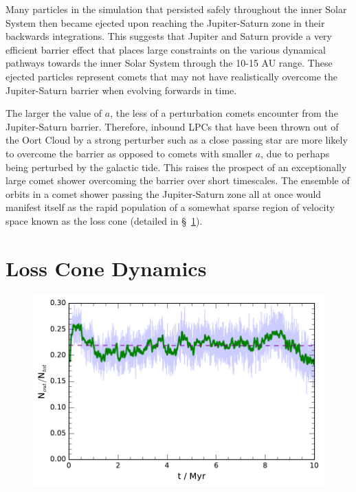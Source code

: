Many particles in the simulation that persisted safely throughout the inner Solar System then became ejected upon reaching the Jupiter-Saturn zone in their backwards integrations. This suggests that Jupiter and Saturn provide a very efficient barrier effect that places large constraints on the various dynamical pathways towards the inner Solar System through the 10-15 AU range. These ejected particles represent comets that may not have realistically overcome the Jupiter-Saturn barrier when evolving forwards in time.

The larger the value of $a$, the less of a perturbation comets encounter from the Jupiter-Saturn barrier. Therefore, inbound LPCs that have been thrown out of the Oort Cloud by a strong perturber such as a close passing star are more likely to overcome the barrier as opposed to comets with smaller $a$, due to perhaps being perturbed by the galactic tide. This raises the prospect of an exceptionally large comet shower overcoming the barrier over short timescales. The ensemble of orbits in a comet shower passing the Jupiter-Saturn zone all at once would manifest itself as the rapid population of a somewhat sparse region of velocity space known as the loss cone (detailed in \S~\ref{sec:loss_cone}). %

\section{Loss Cone Dynamics}
\label{sec:loss_cone}

\begin{figure}[t!]
    \centering
    \includegraphics{figures/exotic_ratio.pdf}
    \caption[]{}
    \label{fig:exotic}
\end{figure}

